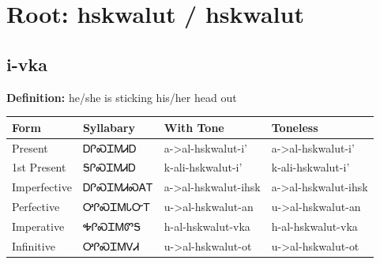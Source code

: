 \documentclass{article}%
\begin{document}
%
\normalsize%
\section*{Root: hskwalut / hskwalut}%
\subsection*{i-vka}%
\textbf{Definition: }%
he/she is sticking his/her head out%
\\[0.5em]%
\begin{tabular}{|l|l|l|l|}%
\hline%
\textbf{Form}&\textbf{Syllabary}&\textbf{With Tone}&\textbf{Toneless}\\%
\hline%
Present&ᎠᎵᏍᏆᎷᏗᎠ&a{-}>al{-}hskwalut{-}i'&a{-}>al{-}hskwalut{-}i'\\%
1st Present&ᎦᎵᏍᏆᎷᏗᎠ&k{-}ali{-}hskwalut{-}i'&k{-}ali{-}hskwalut{-}i'\\%
Imperfective&ᎠᎵᏍᏆᎷᏗᏍᎪᎢ&a{-}>al{-}hskwalut{-}ihsk&a{-}>al{-}hskwalut{-}ihsk\\%
Perfective&ᎤᎵᏍᏆᎷᏓᏅᎢ&u{-}>al{-}hskwalut{-}an&u{-}>al{-}hskwalut{-}an\\%
Imperative&ᎭᎵᏍᏆᎷᏛᎦ&h{-}al{-}hskwalut{-}vka&h{-}al{-}hskwalut{-}vka\\%
Infinitive&ᎤᎵᏍᏆᎷᏙᏗ&u{-}>al{-}hskwalut{-}ot&u{-}>al{-}hskwalut{-}ot\\%
\hline%
\end{tabular}%
\\[1em]%
\end{document}
